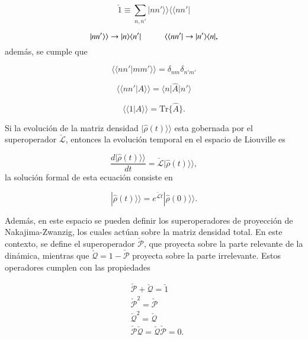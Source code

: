\begin{equation*}
    \check{1}  \equiv \sum_{n,n'}|nn'\rangle \rangle \langle \langle nn'|
\end{equation*}

\begin{equation*}
     |nn'\rangle \rangle   \to |n\rangle \langle n'|  \hspace{10mm}  \langle \langle nn'| \to |n'\rangle \langle n|,
\end{equation*}
además, se cumple que 

\begin{equation*}
     \langle \langle nn'|mm'\rangle \rangle  = \delta_{nm}\delta_{n'm'}
\end{equation*}

\begin{equation*}
    \langle \langle nn'|A\rangle \rangle  = \langle n|\hat{A}|n'\rangle
\end{equation*}

\begin{equation*}
     \langle \langle 1|A\rangle \rangle  = \text{Tr}\{\hat{A}\}.
\end{equation*}


Si la evolución de la matriz densidad $|\hat{\rho}(t)\rangle \rangle$ esta gobernada por el superoperador $\check{\mathcal{L}}$, entonces la evolución temporal en el espacio de Liouville es 

\begin{equation*}
    \frac{d|\hat{\rho}(t) \rangle \rangle}{dt} = \check{\mathcal{L}}|\hat{\rho}(t) \rangle \rangle,
\end{equation*}
la solución formal de esta ecuación consiste en

\begin{equation}
    |\hat{\rho}(t)\rangle \rangle = e^{\check{\mathcal{L}}t}|\hat{\rho}(0)\rangle \rangle. 
    \label{sec2liouvilleformal}
\end{equation}

Además, en este espacio se pueden definir los superoperadores de proyección de Nakajima-Zwanzig, los cuales actúan sobre la matriz densidad total. En este contexto, se define el superoperador \( \check{\mathcal{P}} \), que proyecta sobre la parte relevante de la dinámica, mientras que \( \check{\mathcal{Q}} = 1 - \check{\mathcal{P}} \) proyecta sobre la parte irrelevante\cite{zwanzig1966statistical}. Estos operadores cumplen con las propiedades

\begin{align*}
    & \check{\mathcal{P}} + \check{\mathcal{Q}} = \check{1} \\
    & \check{\mathcal{P}}^{2} = \check{\mathcal{P}} \\
    & \check{\mathcal{Q}}^{2} = \check{\mathcal{Q}} \\
    & \check{\mathcal{P}}\check{\mathcal{Q}} = \check{\mathcal{Q}}\check{\mathcal{P}} = 0.
\end{align*}    

